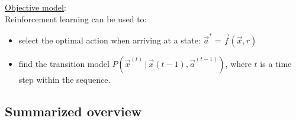 \begin{frame}

\underline{Objective model}:\\
Reinforcement learning can be used to:
\begin{itemize}
\item select the optimal action when arriving at a state: $\vec a^* = \vec f(\vec x, r)$
\item find the transition model $P(\vec x^{(t)}\,|\,\vec x{(t-1)}, \vec a^{(t-1)})$, where $t$ is a time step within the sequence.
\end{itemize}
\pause
{}

\end{frame}

\newpage

\subsection{Summarized overview}

